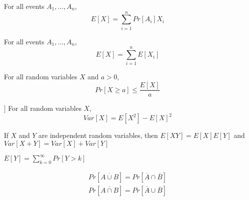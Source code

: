 \begin{theorem}
	For all events $A_1,\hdots,A_n$,
	$$
	E[X] = \sum_{i=1}^n Pr[A_i]X_i
	$$
\end{theorem}

\begin{theorem}
	For all events $A_1,\hdots,A_n$,
	$$
	E[X] = \sum_{i=1}^n E[X_i]
	$$
\end{theorem}

\begin{theorem}
	For all random variables $X$ and $a>0$,
	$$
	Pr[X\geq a] \leq \frac{E[X]}{a}
	$$
\end{theorem}

\begin{theorem}[Varience]]
	For all random variables $X$,
	$$
	Var[X] = E[X^2] - E[X]^2
	$$
\end{theorem}

\begin{theorem}
If $X$ and $Y$ are independent random variables, then $E[XY] = E[X]E[Y]$ and $Var[X+Y] = Var[X] + Var[Y]$
\end{theorem}

\begin{theorem}
	$E[Y] = \sum_{k=0}^\infty Pr[Y>k]$
\end{theorem}

\begin{theorem}
	\begin{equation*}
		\begin{split}
			Pr[\overline{A\cup B}] = Pr[\overline{A}\cap \overline{B}]\\
			Pr[\overline{A\cap B}] = Pr[\overline{A}\cup \overline{B}]
		\end{split}
	\end{equation*}
\end{theorem}


